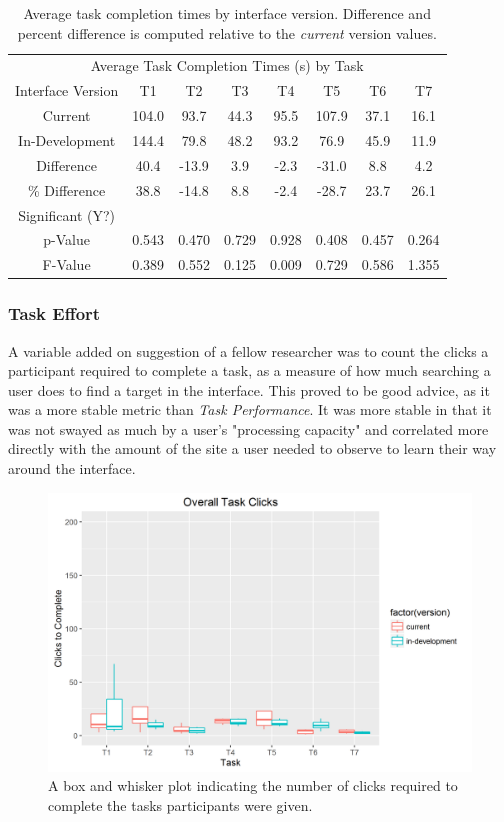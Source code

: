 \documentclass{article}
\begin{document}
\begin{table}[h]
    \centering
    \begin{tabular}{| c | c | c | c | c | c | c | c |}
    \hline
    \multicolumn{8}{|c|}{Average Task Completion Times (s) by Task} \\
    Interface Version & T1 & T2 & T3 & T4 & T5 & T6 & T7 \\
    \hline
    \hline
    Current           & 104.0 &  93.7 &  44.3 &  95.5 & 107.9 &  37.1 &   16.1 \\
    \hline
    In-Development    & 144.4 &  79.8 &  48.2 &  93.2 &  76.9 &  45.9 &   11.9 \\
    \hline
    \hline
    Difference        & 40.4  & -13.9 &   3.9 &  -2.3 & -31.0 &   8.8 &    4.2 \\
    \hline
    \% Difference     & 38.8  & -14.8 &   8.8 &  -2.4 & -28.7 &  23.7 &   26.1 \\
    \hline
    \hline
    Significant (Y?) &        &       &       &       &       &       &       \\
    \hline
    p-Value          & 0.543  & 0.470 & 0.729 & 0.928 & 0.408 & 0.457 & 0.264 \\
    \hline
    F-Value          & 0.389  & 0.552 & 0.125 & 0.009 & 0.729 & 0.586 & 1.355 \\
    \hline
    \end{tabular}
    
    \caption{Average task completion times by interface version. Difference and percent difference is computed relative to the \emph{current} version values.}
    \label{tab:avg_task_time}
\end{table}

%
\subsubsection{Task Effort}
A variable added on suggestion of a fellow researcher was to count the clicks a participant required to complete a task, as a measure of how much searching a user does to find a target in the interface. This proved to be good advice, as it was a more stable metric than \emph{Task Performance}. It was more stable in that it was not swayed as much by a user's "processing capacity" and correlated more directly with the amount of the site a user needed to observe to learn their way around the interface.

\begin{figure}[h!]
  \centering
  \includegraphics[width=.6\linewidth]{overall_task_clicks}
  \caption{A box and whisker plot indicating the number of clicks required to complete the tasks participants were given.}
  \label{fig:overall_task_clicks}
\end{figure}
\end{document}
